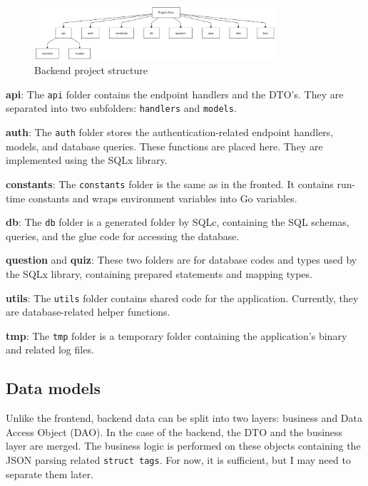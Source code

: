 \begin{figure}[H]
	\centering
	\includegraphics[width=0.8\textwidth, keepaspectratio]{figures/backend-project-structure.png}
	\caption{Backend project structure}
	\label{fig:backend-project-structure}
\end{figure}

\textbf{api}: The \texttt{api} folder contains the endpoint handlers and the DTO's. They are separated into two subfolders: \texttt{handlers} and \texttt{models}.

\textbf{auth}: The \texttt{auth} folder stores the authentication-related endpoint handlers, models, and database queries. These functions are placed here. They are implemented using the SQLx library.

\textbf{constants}: The \texttt{constants} folder is the same as in the fronted. It contains run-time constants and wraps environment variables into Go variables.

\textbf{db}: The \texttt{db} folder is a generated folder by SQLc, containing the SQL schemas, queries, and the glue code for accessing the database.

\textbf{question} and \textbf{quiz}: These two folders are for database codes and types used by the SQLx library, containing prepared statements and mapping types.

\textbf{utils}: The \texttt{utils} folder contains shared code for the application. Currently, they are database-related helper functions.

\textbf{tmp}: The \texttt{tmp} folder is a temporary folder containing the application's binary and related log files.

\subsection{Data models}

Unlike the frontend, backend data can be split into two layers: business and Data Access Object (DAO). In the case of the backend, the DTO and the business layer are merged. The business logic is performed on these objects containing the JSON parsing related \texttt{struct tags}. For now, it is sufficient, but I may need to separate them later.

